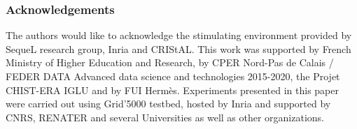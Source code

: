 \documentclass{article}
\begin{document}
\subsubsection*{Acknowledgements}
The authors would like to acknowledge the stimulating environment provided by SequeL research group, Inria and CRIStAL. This work was supported by French Ministry of Higher Education and Research, by CPER Nord-Pas de Calais / FEDER DATA Advanced data science and technologies 2015-2020, the Projet CHIST-ERA IGLU and by FUI Herm\`{e}s. Experiments presented in this paper were carried out using Grid'5000 testbed, hosted by Inria and supported by CNRS, RENATER and several Universities as well as other organizations. 

{\small


}
\end{document}
